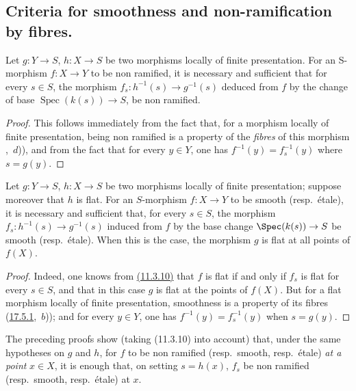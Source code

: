\subsection{Criteria for smoothness and non-ramification by fibres.}
\label{subsection:IV.17.8}
\label{IV.17.8}


\begin{proposition}[17.8.1]
\label{IV.17.8.1}
Let $g:Y\to S$, $h:X\to S$ be two morphisms locally of finite presentation.
For an S-morphism $f:X\to Y$ to be non ramified, it is necessary and sufficient that for every $s\in S$, the morphism $f_s:h^{-1}(s)\to g^{-1}(s)$ deduced from $f$ by the change of base $\operatorname{Spec}(k(s))\to S$, be non ramified.
\end{proposition}

\begin{proof}
This follows immediately from the fact that, for a morphism locally of finite presentation, being non ramified is a property of the \emph{fibres} of this morphism ,~$d$)), and from the fact that for every $y\in Y$, one has $f^{-1}(y)=f_s^{-1}(y)$ where $s=g(y)$.
\end{proof}

\begin{proposition}[17.8.2]
\label{IV.17.8.2}
Let $g:Y\to S$, $h:X\to S$ be two morphisms locally of finite presentation; suppose moreover that $h$ is flat.
For an $S$-morphism $f:X\to Y$ to be smooth (resp.\ \'etale), it is necessary and sufficient that, for every $s\in S$, the morphism $f_s:h^{-1}(s)\to g^{-1}(s)$ induced from $f$ by the base change $\Spec(k(s))\to S$ be smooth (resp.\ \'etale).
When this is the case, the morphism $g$ is flat at all points of $f(X)$.
\end{proposition}

\begin{proof}
Indeed, one knows from {\hyperlink{ega4.c04.thm.11-3-10}{(11.3.10)}} that $f$ is flat if and only if $f_s$ is flat for every $s\in S$, and that in this case $g$ is flat at the points of $f(X)$.
But for a flat morphism locally of finite presentation, smoothness is a property of its fibres ({\hyperlink{ega4.c04.thm.17-5-1}{17.5.1}},~$b$)); and for every $y\in Y$, one has $f^{-1}(y)=f_s^{-1}(y)$ when $s=g(y)$.
\end{proof}

\begin{remark}[17.8.3]
\label{IV.17.8.3}
The preceding proofs show (taking (11.3.10) into account) that, under the same hypotheses on $g$ and $h$, for $f$ to be non ramified (resp.\ smooth, resp.\ \'etale) \emph{at a point} $x\in X$, it is enough that, on setting $s=h(x)$, $f_s$ be non ramified (resp.\ smooth, resp.\ \'etale) at $x$.
\end{remark}


